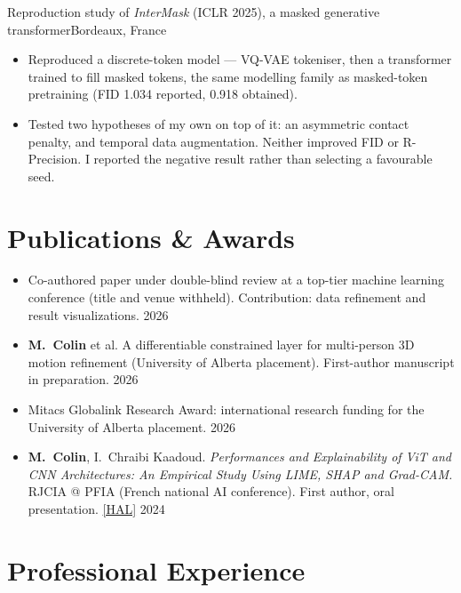 \entrygap

%
{Reproduction study of \textit{InterMask} (ICLR 2025), a masked generative transformer}{Bordeaux, France}
\begin{itemize}
    \item Reproduced a discrete-token model --- VQ-VAE tokeniser, then a transformer trained to fill masked tokens, the same modelling family as masked-token pretraining (FID 1.034 reported, 0.918 obtained).
    \item Tested two hypotheses of my own on top of it: an asymmetric contact penalty, and temporal data augmentation. Neither improved FID or R-Precision. I reported the negative result rather than selecting a favourable seed.
\end{itemize}

\section{Publications \& Awards}
\begin{itemize}
\ifdefined\PUBLICVERSION\else
    \item Co-authored paper under double-blind review at a top-tier machine learning conference (title and venue withheld). Contribution: data refinement and result visualizations. \hfill 2026
\fi
    \item \textbf{M.\ Colin} et al. A differentiable constrained layer for multi-person 3D motion refinement (University of Alberta placement). First-author manuscript in preparation. \hfill 2026
    \item Mitacs Globalink Research Award: international research funding for the University of Alberta placement. \hfill 2026
    \item \textbf{M.\ Colin}, I.\ Chraibi Kaadoud. \textit{Performances and Explainability of ViT and CNN Architectures: An Empirical Study Using LIME, SHAP and Grad-CAM.} RJCIA @ PFIA (French national AI conference). First author, oral presentation. \href{https://hal.science/hal-04641791}{[HAL]} \hfill 2024
\end{itemize}

\section{Professional Experience}


